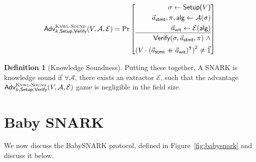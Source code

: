 \documentclass{article}
\theoremstyle{definition}
\newtheorem{definition}{Definition}[section]
\theoremstyle{remark}
\newcommand{\Adv}{\mathcal{A}}
\newcommand{\Ext}{\mathcal{E}}
\newcommand{\mdoubleplus}{\ensuremath{\mathbin{+\mkern-10mu+}}}
\begin{document}
  \[
  \textsf{Adv}^{\textsc{Knwl-Sound}}_{k,\textsf{Setup},\textsf{Verify}}(V, \Adv, \Ext) =
  \Pr \left[
    \begin{aligned}
    \sigma \leftarrow \textsf{Setup($V$)}\\
    \vec{a}_{\textsf{stmt}}, \pi, \textsf{alg} \leftarrow \Adv(\sigma)\\
    \vec{a}_{\textsf{wit}} \leftarrow \Ext(\textsf{alg}) \\
    \hline  ~\\[-13pt]
    \textsf{Verify}(\sigma, \vec{a}_\textsf{stmt}, \pi) ~\land \\
    \left( V\cdot \left( \vec{a}_{\textsf{stmt}} \mdoubleplus \vec{a}_\textsf{wit} \right)^\intercal \right)^2 \neq \vec{1} 
    \end{aligned}
  \right]
  \]

\begin{definition}[Knowledge Soundness]
Putting these together, A SNARK is knowledge sound if $\forall \Adv$, there exists an extractor $\Ext$, such that the advantage  $\textsf{Adv}^{\textsc{Knwl-Sound}}_{k,\textsf{Setup},\textsf{Verify}}(V, \Adv, \Ext)$ game is negligible in the field size.
\end{definition}

\section{Baby SNARK}
We now discuss the BabySNARK protocol, defined in Figure~\ref{fig:babysnark}
and discuss it below.
\end{document}
